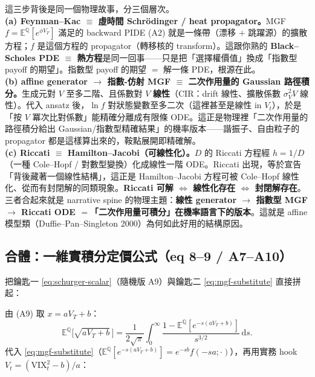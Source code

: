 \documentclass[12pt, a4paper]{article}
\theoremstyle{remark}
\newcommand{\E}{\mathbb{E}}
\newcommand{\Q}{\mathbb{Q}}
\newcommand{\dd}{\mathrm{d}}
\newcommand{\VIX}{\mathrm{VIX}}
\begin{document}
\begin{physicsbox}[title={為什麼 affine 模型可解：一段連貫的物理敘事}]
這三步背後是同一個物理故事，分三個層次。\\[3pt]
\textbf{(a) Feynman--Kac $\equiv$ 虛時間 Schrödinger / heat propagator。}MGF $f=\E^\Q[e^{\phi V_T}]$ 滿足的 backward PIDE (A2) 就是一條帶（漂移 $+$ 跳躍源）的擴散方程；$f$ 是這個方程的 propagator（轉移核的 transform）。這跟你熟的 \textbf{Black--Scholes PDE $\equiv$ 熱方程}是同一回事——只是把「選擇權價值」換成「指數型 payoff 的期望」。指數型 payoff 的期望 $=$ 解一條 PDE，根源在此。\\[3pt]
\textbf{(b) affine generator $\to$ 指數-仿射 MGF $\equiv$ 二次作用量的 Gaussian 路徑積分。}生成元對 $V$ 至多二階、且係數對 $V$ \textbf{線性}（CIR：drift 線性、擴散係數 $\sigma_V^2 V$ 線性）。代入 ansatz 後，$\ln f$ 對狀態變數至多二次（這裡甚至是線性 in $V_t$），於是「按 $V$ 冪次比對係數」能精確分離成有限條 ODE。這正是物理裡「二次作用量的路徑積分給出 Gaussian/指數型精確結果」的機率版本——諧振子、自由粒子的 propagator 都是這樣算出來的，鞍點展開即精確解。\\[3pt]
\textbf{(c) Riccati $\equiv$ Hamilton--Jacobi（可線性化）。}$D$ 的 Riccati 方程經 $h=1/D$（一種 Cole--Hopf / 對數型變換）化成線性一階 ODE。Riccati 出現，等於宣告「背後藏著一個線性結構」，這正是 Hamilton--Jacobi 方程可被 Cole--Hopf 線性化、從而有封閉解的同類現象。\textbf{Riccati 可解 $\Leftrightarrow$ 線性化存在 $\Leftrightarrow$ 封閉解存在}。\\[3pt]
三者合起來就是 narrative spine 的物理主題：\textbf{線性 generator $\to$ 指數型 MGF $\to$ Riccati ODE $=$「二次作用量可積分」在機率語言下的版本}。這就是 affine 模型類（Duffie--Pan--Singleton 2000）為何如此好用的結構原因。
\end{physicsbox}

\subsection{合體：一維實積分定價公式（eq 8--9 / A7--A10）}

把鑰匙一 \eqref{eq:schurger-scalar}（隨機版 A9）與鑰匙二 \eqref{eq:mgf-substitute} 直接拼起：

\begin{derivbox}[title={Step 3 $+$ Step 4 $\to$ eq 9}]
由 (A9) 取 $x=aV_T+b$：
\[
  \E^\Q\!\big[\sqrt{aV_T+b}\,\big] = \frac{1}{2\sqrt\pi}\int_0^\infty\frac{1-\E^\Q[e^{-s(aV_T+b)}]}{s^{3/2}}\,\dd s.
\]
代入 \eqref{eq:mgf-substitute}（$\E^\Q[e^{-s(aV_T+b)}]=e^{-sb}f(-sa;\cdot)$），再用實務 hook $V_t=(\VIX_t^2-b)/a$：
\end{derivbox}
\end{document}
